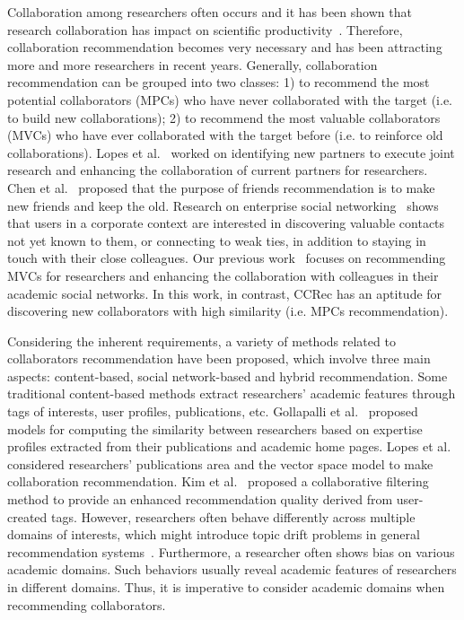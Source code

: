 \documentclass[10pt,letterpaper]{article}
\begin{document}
Collaboration among researchers often occurs and it has been shown that research collaboration has impact on scientific productivity~\cite{lee2005impact}. Therefore, collaboration recommendation becomes very necessary and has been attracting more and more researchers in recent years. Generally, collaboration recommendation can be grouped into two classes: 1) to recommend the most potential collaborators (MPCs) who have never collaborated with the target (i.e. to build new collaborations); 2) to recommend the most valuable collaborators (MVCs) who have ever collaborated with the target before (i.e. to reinforce old collaborations). Lopes et al.~\cite{lopes2010collaboration} worked on identifying new partners to execute joint research and enhancing the collaboration of current partners for researchers. Chen et al.~\cite{chen2009make} proposed that the purpose of friends recommendation is to make new friends and keep the old. Research on enterprise social networking~\cite{dimicco2008motivations} shows that users in a corporate context are interested in discovering valuable contacts not yet known to them, or connecting to weak ties, in addition to staying in touch with their close colleagues. Our previous work~\cite{li2014acrec,xia2014mvcwalker} focuses on recommending MVCs for researchers and enhancing the collaboration with colleagues in their academic social networks. In this work, in contrast, CCRec has an aptitude for discovering new collaborators with high similarity (i.e. MPCs recommendation).

Considering the inherent requirements, a variety of methods related to collaborators recommendation have been proposed, which involve three main aspects: content-based, social network-based and hybrid recommendation. Some traditional content-based methods extract researchers' academic features through tags of interests, user profiles, publications, etc. Gollapalli et al.~\cite{gollapalli2012similar} proposed models for computing the similarity between researchers based on expertise profiles extracted from their publications and academic home pages. Lopes et al.~\cite{lopes2010collaboration} considered researchers' publications area and the vector space model to make collaboration recommendation. Kim et al.~\cite{kim2010collaborative} proposed a collaborative filtering method to provide an enhanced recommendation quality derived from user-created tags. However, researchers often behave differently across multiple domains of interests, which might introduce topic drift problems in general recommendation systems~\cite{tang2012cross}. Furthermore, a researcher often shows bias on various academic domains. Such behaviors usually reveal academic features of researchers in different domains. Thus, it is imperative to consider academic domains when recommending collaborators.
\end{document}
